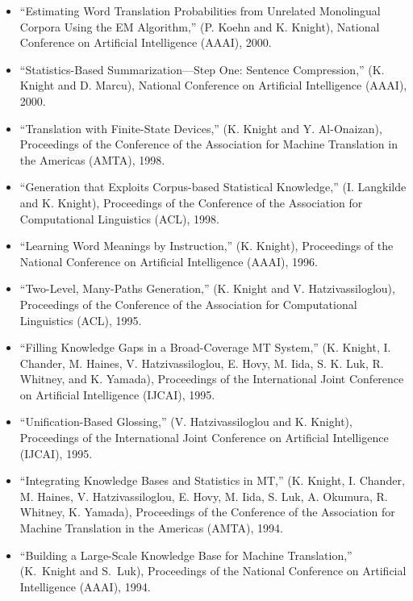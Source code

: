\begin{itemize}
\item ``Estimating Word Translation Probabilities from Unrelated 
Monolingual Corpora Using the EM Algorithm,'' (P. Koehn and K. Knight),
National Conference on Artificial Intelligence (AAAI), 2000. 

\item ``Statistics-Based Summarization---Step One: Sentence Compression,'' 
(K. Knight and D. Marcu), National Conference on Artificial
Intelligence (AAAI), 2000.  

\item ``Translation with Finite-State Devices,''
(K. Knight and Y. Al-Onaizan),
Proceedings of the Conference of the Association for Machine
Translation in the Americas (AMTA), 
1998.

\item ``Generation that Exploits Corpus-based Statistical Knowledge,''
(I. Langkilde and K. Knight), Proceedings of the Conference of the 
Association for Computational Linguistics (ACL), 1998.

\item ``Learning Word Meanings by Instruction,'' 
(K. Knight),
Proceedings of the National 
Conference on Artificial Intelligence (AAAI), 1996.

\item ``Two-Level, Many-Paths Generation,''
(K. Knight and V. Hatzivassiloglou), Proceedings of the Conference of the 
Association for Computational Linguistics (ACL), 1995.

\item ``Filling Knowledge Gaps in a Broad-Coverage MT System,''
(K. Knight, I. Chander, M. Haines, V. Hatzivassiloglou,
E. Hovy, M. Iida, S. K. Luk, R. Whitney,
and K. Yamada), Proceedings of the International Joint Conference on Artificial Intelligence (IJCAI), 1995.

\item ``Unification-Based Glossing,''
(V. Hatzivassiloglou and K. Knight), Proceedings of the International Joint Conference on Artificial Intelligence (IJCAI), 1995.

\item ``Integrating Knowledge Bases and Statistics in MT,''
(K. Knight, I. Chander, M. Haines, V. Hatzivassiloglou,  E. Hovy,
M. Iida, S. Luk, A. Okumura, R. Whitney, K. Yamada),
Proceedings of the Conference of the Association for Machine Translation 
in the Americas (AMTA), 1994.

\item ``Building a Large-Scale Knowledge Base for Machine Translation,''
(K.~Knight and S.~Luk), 
Proceedings of the National Conference on Artificial Intelligence (AAAI), 1994.


\end{itemize}
